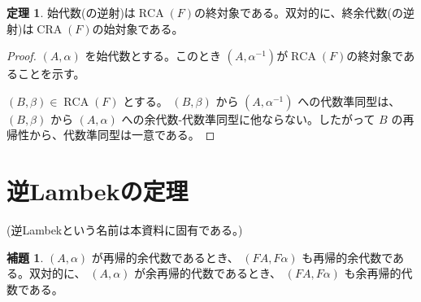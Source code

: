 \documentclass[dvipdfmx,uplatex,papersize,a4paper,10pt]{jsarticle}
\theoremstyle{definition}
\newtheorem{theorem}[definition]{定理}
\newtheorem{lemma}[definition]{補題}
\DeclareMathOperator{\RCA}{RCA}
\DeclareMathOperator{\CRA}{CRA}
\begin{document}
\begin{theorem}
  始代数(の逆射)は$\RCA(F)$の終対象である。双対的に、終余代数(の逆射)は$\CRA(F)$の始対象である。
\end{theorem}

\begin{proof}
  $(A, \alpha)$ を始代数とする。このとき $(A, \alpha^{-1})$が$\RCA(F)$の終対象であることを示す。

  $(B, \beta) \in \RCA(F)$ とする。 $(B, \beta)$ から $(A, \alpha^{-1})$ への代数準同型は、$(B, \beta)$ から $(A, \alpha)$ への余代数-代数準同型に他ならない。したがって $B$ の再帰性から、代数準同型は一意である。

\end{proof}

\section{逆Lambekの定理}

(逆Lambekという名前は本資料に固有である。)

\begin{lemma}
  $(A, \alpha)$ が再帰的余代数であるとき、 $(FA, F\alpha)$ も再帰的余代数である。双対的に、 $(A, \alpha)$ が余再帰的代数であるとき、 $(FA, F\alpha)$ も余再帰的代数である。
\end{lemma}
\end{document}
